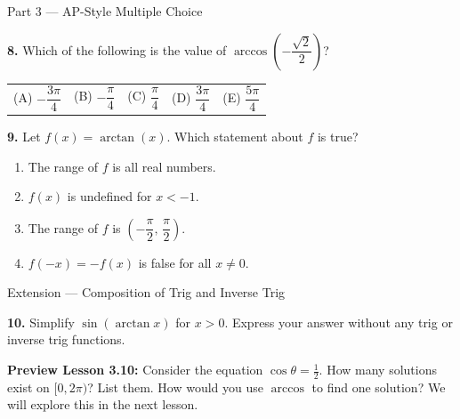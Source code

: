 \documentclass[10pt]{article}
\begin{document}
\begin{notesbox}{Part 3 --- AP-Style Multiple Choice}

\textbf{8.} Which of the following is the value of $\arccos\!\left(-\dfrac{\sqrt{2}}{2}\right)$?

\begin{tabularx}{\linewidth}{@{} X X X X X @{}}
(A) $-\dfrac{3\pi}{4}$ &
(B) $-\dfrac{\pi}{4}$ &
(C) $\dfrac{\pi}{4}$ &
(D) $\dfrac{3\pi}{4}$ &
(E) $\dfrac{5\pi}{4}$
\end{tabularx}

\vspace{0.10in}

\textbf{9.} Let $f(x) = \arctan(x)$.  Which statement about $f$ is true?

\begin{enumerate}[leftmargin=2em, label=(\Alph*), itemsep=3pt]
    \item The range of $f$ is all real numbers.
    \item $f(x)$ is undefined for $x < -1$.
    \item The range of $f$ is $\left(-\dfrac{\pi}{2},\,\dfrac{\pi}{2}\right)$.
    \item $f(-x) = -f(x)$ is false for all $x \ne 0$.
\end{enumerate}

\end{notesbox}

\vspace{0.08in}

\begin{extensionbox}{Extension --- Composition of Trig and Inverse Trig}

\textbf{10.} Simplify $\sin(\arctan x)$ for $x > 0$.  Express your answer
without any trig or inverse trig functions.


\vspace{0.06in}

\textbf{Preview Lesson 3.10:} Consider the equation $\cos\theta = \tfrac{1}{2}$.
How many solutions exist on $[0, 2\pi)$?  List them.  How would you use
$\arccos$ to find one solution?  We will explore this in the next lesson.


\end{extensionbox}
\end{document}
